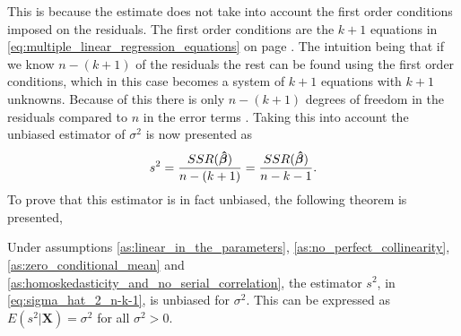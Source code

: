 This is because the estimate does not take into account the first order conditions imposed on the residuals.
The first order conditions are the $k + 1$ equations in \eqref{eq:multiple_linear_regression_equations} on page \pageref{eq:multiple_linear_regression_equations}.
The intuition being that if we know $n - (k + 1)$ of the residuals the rest can be found using the first order conditions, which in this case becomes a system of $k + 1$ equations with $k + 1$ unknowns. 
Because of this there is only $n - (k + 1)$ degrees of freedom in the residuals compared to $n$ in the error terms \cite[p. 55]{Wooldridge2012}.
Taking this into account the unbiased estimator of $\sigma^2$ is now presented as
\begin{align} \label{eq:sigma_hat_2_n-k-1}
    s^2 = \frac{SSR(\operatorname{\boldsymbol{\hat{\beta}}})}{n - (k + 1)} = \frac{SSR(\operatorname{\boldsymbol{\hat{\beta}}})}{n - k - 1}.
\end{align}
To prove that this estimator is in fact unbiased, the following theorem is presented,
\begin{theorem}
    Under assumptions \ref{as:linear_in_the_parameters}, \ref{as:no_perfect_collinearity}, \ref{as:zero_conditional_mean} and \ref{as:homoskedasticity_and_no_serial_correlation}, the estimator $s^2$, in \eqref{eq:sigma_hat_2_n-k-1}, is unbiased for $\sigma^2$. This can be expressed as $E(s^2|\mathbf{X}) = \sigma^2$ for all $\sigma^2 > 0$.
\end{theorem}
